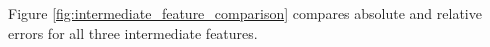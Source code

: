Figure \ref{fig:intermediate_feature_comparison} compares absolute and relative errors for all three intermediate features.

%









%

